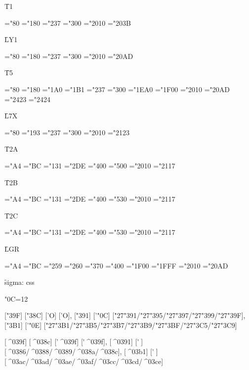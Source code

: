 {\f T1}

\ToneZZZRegular
\ChrA="80 \ChrB="180
\PrintCode
\ChrA="237 \ChrB="300
\PrintCode
\ChrA="2010 \ChrB="203B
\PrintCode

{\f LY1}

\LYoneZZZRegular
\ChrA="80 \ChrB="180
\PrintCode
\ChrA="237 \ChrB="300
\PrintCode
\ChrA="2010 \ChrB="20AD
\PrintCode


{\f T5}

\TfiveZZZRegular
\ChrA="80 \ChrB="180
\PrintCode
\ChrA="1A0 \ChrB="1B1
\PrintCode
\ChrA="237 \ChrB="300
\PrintCode
\ChrA="1EA0 \ChrB="1F00
\PrintCode
\ChrA="2010 \ChrB="20AD
\PrintCode
\ChrA="2423 \ChrB="2424
\PrintCode

{\f L7X}

\LsvnXZZZRegular
\ChrA="80 \ChrB="193
\PrintCode
\ChrA="237 \ChrB="300
\PrintCode
\ChrA="2010 \ChrB="2123
\PrintCode

{\f T2A}

\TtwoaZZZRegular
\ChrA="A4 \ChrB="BC
\PrintCode
\ChrA="131 \ChrB="2DE
\PrintCode
\ChrA="400 \ChrB="500
\PrintCode
\ChrA="2010 \ChrB="2117
\PrintCode

{\f T2B}

\TtwobZZZRegular
\ChrA="A4 \ChrB="BC
\PrintCode
\ChrA="131 \ChrB="2DE
\PrintCode
\ChrA="400 \ChrB="530
\PrintCode
\ChrA="2010 \ChrB="2117
\PrintCode

{\f T2C}

\TtwocZZZRegular
\ChrA="A4 \ChrB="BC
\PrintCode
\ChrA="131 \ChrB="2DE
\PrintCode
\ChrA="400 \ChrB="530
\PrintCode
\ChrA="2010 \ChrB="2117
\PrintCode

{\f LGR}

\LgrZZZRegular
\ChrA="A4 \ChrB="BC
\PrintCode
\ChrA="259 \ChrB="260
\PrintCode
\ChrA="370 \ChrB="400
\PrintCode
\ChrA="1F00 \ChrB="1FFF
\PrintCode
\ChrA="2010 \ChrB="20AD
\PrintCode

{\f sigma:} ^^63^^73^^73

\catcode"0C=12

[\char"39F] [\char"38C] ['\relax Ο] ['Ο],
[\char"391] ['\char"0C] [\char"27\char"391/\char"27\char"395/\char"27\char"397/\char"27\char"399/\char"27\char"39F],
[\char"3B1] ['\char"0E] [\char"27\char"3B1/\char"27\char"3B5/\char"27\char"3B7/\char"27\char"3B9/\char"27\char"3BF/\char"27\char"3C5/\char"27\char"3C9]

[^^^^039f] [^^^^038c] ['\relax ^^^^039f] [^^27^^^^039f],
[^^^^0391] [^^27^^0c] [^^^^0386/^^^^0388/^^^^0389/^^^^038a/^^^^038c],
[^^^^03b1] [^^27^^0e] [^^^^03ac/^^^^03ad/^^^^03ae/^^^^03af/^^^^03cc/^^^^03cd/^^^^03ce]

\bye
